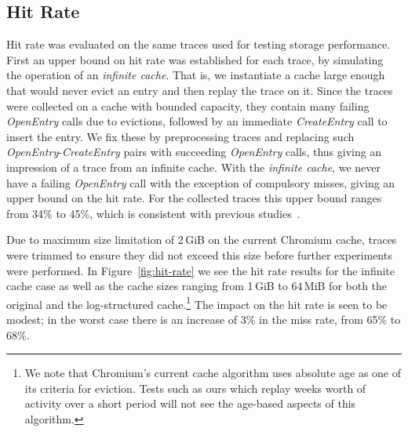 \documentclass{sig-alternate}
\begin{document}
\subsection{Hit Rate}

Hit rate was evaluated on the same traces used for testing storage
performance. First an upper bound on hit rate was established for each trace, by
simulating the operation of an \emph{infinite cache}.  That is, we instantiate a
cache large enough that would never evict an entry and then replay the trace on
it.  Since the traces were collected on a cache with bounded capacity, they
contain many failing \emph{OpenEntry} calls due to evictions, followed by an
immediate \emph{CreateEntry} call to insert the entry.  We fix these by
preprocessing traces and replacing such \emph{OpenEntry}-\emph{CreateEntry}
pairs with succeeding \emph{OpenEntry} calls, thus giving an impression of a
trace from an infinite cache.  With the \emph{infinite cache}, we never have a
failing \emph{OpenEntry} call with the exception of compulsory misses, giving an
upper bound on the hit rate.  For the collected traces this upper bound ranges
from 34\% to 45\%, which is consistent with previous studies~\cite{souders12}.

Due to maximum size limitation of 2\,GiB on the current Chromium cache, traces
were trimmed to ensure they did not exceed this size before further experiments
were performed.  In Figure~\ref{fig:hit-rate} we see the hit rate results for
the infinite cache case as well as the cache sizes ranging from 1\,GiB to
64\,MiB for both the original and the log-structured cache.\footnote{We note
  that Chromium's current cache algorithm uses absolute age as one of its
  criteria for eviction. Tests such as ours which replay weeks worth of activity
  over a short period will not see the age-based aspects of this algorithm.}
The impact on the hit rate is seen to be modest; in the worst case there is an
increase of 3\% in the miss rate, from 65\% to 68\%.
\end{document}
